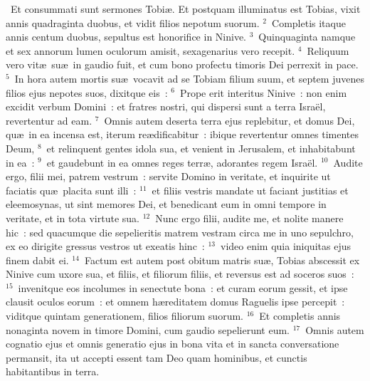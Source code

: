 ~\lettrine[lines=10,image=true,loversize=0.05,lraise=-0.03]{E}{}t consummati sunt sermones Tobi\ae . Et postquam illuminatus est Tobias, vixit annis quadraginta duobus, et vidit filios nepotum suorum.
${}^{2}$~Completis itaque annis centum duobus, sepultus est honorifice in Ninive.
${}^{3}$~Quinquaginta namque et sex annorum lumen oculorum amisit, sexagenarius vero recepit.
${}^{4}$~Reliquum vero vit\ae\ su\ae\ in gaudio fuit, et cum bono profectu timoris Dei perrexit in pace.
${}^{5}$~In hora autem mortis su\ae\ vocavit ad se Tobiam filium suum, et septem juvenes filios ejus nepotes suos, dixitque eis~:
${}^{6}$~Prope erit interitus Ninive~: non enim excidit verbum Domini~: et fratres nostri, qui dispersi sunt a terra Isra\"el, revertentur ad eam.
${}^{7}$~Omnis autem deserta terra ejus replebitur, et domus Dei, qu\ae\ in ea incensa est, iterum re\ae dificabitur~: ibique revertentur omnes timentes Deum,
${}^{8}$~et relinquent gentes idola sua, et venient in Jerusalem, et inhabitabunt in ea~:
${}^{9}$~et gaudebunt in ea omnes reges terr\ae , adorantes regem Isra\"el.
${}^{10}$~Audite ergo, filii mei, patrem vestrum~: servite Domino in veritate, et inquirite ut faciatis qu\ae\ placita sunt illi~:
${}^{11}$~et filiis vestris mandate ut faciant justitias et eleemosynas, ut sint memores Dei, et benedicant eum in omni tempore in veritate, et in tota virtute sua.
${}^{12}$~Nunc ergo filii, audite me, et nolite manere hic~: sed quacumque die sepelieritis matrem vestram circa me in uno sepulchro, ex eo dirigite gressus vestros ut exeatis hinc~:
${}^{13}$~video enim quia iniquitas ejus finem dabit ei.
${}^{14}$~Factum est autem post obitum matris su\ae , Tobias abscessit ex Ninive cum uxore sua, et filiis, et filiorum filiis, et reversus est ad soceros suos~:
${}^{15}$~invenitque eos incolumes in senectute bona~: et curam eorum gessit, et ipse clausit oculos eorum~: et omnem h\ae reditatem domus Raguelis ipse percepit~: viditque quintam generationem, filios filiorum suorum.
${}^{16}$~Et completis annis nonaginta novem in timore Domini, cum gaudio sepelierunt eum.
${}^{17}$~Omnis autem cognatio ejus et omnis generatio ejus in bona vita et in sancta conversatione permansit, ita ut accepti essent tam Deo quam hominibus, et cunctis habitantibus in terra.
